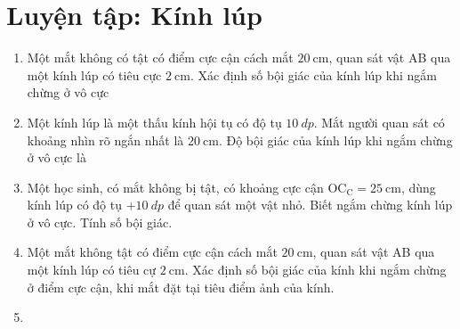 \chapter{Luyện tập: Kính lúp}
\begin{enumerate}
	\item %
	Một mắt không có tật có điểm cực cận cách mắt $\SI{20}{\centi\meter}$, quan sát vật AB qua một kính lúp có tiêu cực $\SI{2}{\centi\meter}$. Xác định số bội giác của kính lúp khi ngắm chừng ở vô cực
	\item %
	Một kính lúp là một thấu kính hội tụ có độ tụ $\SI{10}{dp}$. Mắt người quan sát có khoảng nhìn rõ ngắn nhất là $\SI{20}{\centi\meter}$. Độ bội giác của kính lúp khi ngắm chừng ở vô cực là 
	\item %
	Một học sinh, có mắt không bị tật, có khoảng cực cận $\text{OC}_\text{C}=\SI{25}{\centi\meter}$, dùng kính lúp có độ tụ $+\SI{10}{dp}$ để quan sát một vật nhỏ. Biết ngắm chừng kính lúp ở vô cực. Tính số bội giác. 
	\item %
	Một mắt không tật có điểm cực cận cách mắt $\SI{20}{\centi\meter}$, quan sát vật AB qua một kính lúp có tiêu cự $\SI{2}{\centi\meter}$. Xác định số bội giác của kính khi ngắm chừng ở điểm cực cận, khi mắt đặt tại tiêu điểm ảnh của kính.
	\item %

\end{enumerate}
